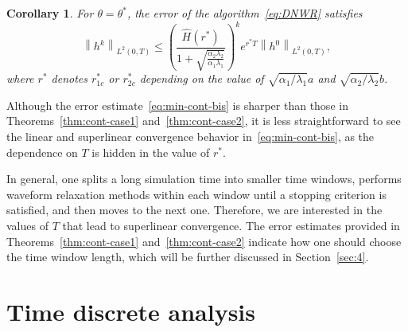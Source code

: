 \documentclass[10pt,a4paper]{amsart}
\newtheorem{corollary}{Corollary}
\newcommand{\norm}[1]{\left\lVert#1\right\rVert}
\begin{document}
\begin{corollary}\label{thm:min-cont-bis}
For $\theta = \theta^*$, the error of the algorithm~\eqref{eq:DNWR} satisfies 
\begin{equation}\label{eq:min-cont-bis}
\norm{h^k}_{L^2(0, T)} 
\leq \left(\frac{ \hat H(r^*)}{1+\sqrt{\frac{\alpha_2\lambda_2}{\alpha_1\lambda_1}}}\right)^k e^{r^*T}\norm{h^0}_{L^2(0, T)},
\end{equation} 
where $r^*$ denotes $r_{1c}^*$ or $r_{2c}^*$ depending on the value of $\sqrt{\alpha_1/\lambda_1} a$ and $\sqrt{\alpha_2/\lambda_2} b$. 
\end{corollary}

Although the error estimate~\eqref{eq:min-cont-bis} is sharper than those in Theorems~\ref{thm:cont-case1} and~\ref{thm:cont-case2}, it is less straightforward to see the linear and superlinear convergence behavior in~\eqref{eq:min-cont-bis}, as the dependence on $T$ is hidden in the value of $r^*$. 

In general, one splits a long simulation time into smaller time windows, performs waveform relaxation methods within each window until a stopping criterion is satisfied, and then moves to the next one. Therefore, we are interested in the values of $T$ that lead to superlinear convergence. The error estimates provided in Theorems~\ref{thm:cont-case1} and~\ref{thm:cont-case2} indicate how one should choose the time window length, which will be further discussed in Section~\ref{sec:4}.
\section{Time discrete analysis}\label{sec:3}
\end{document}
